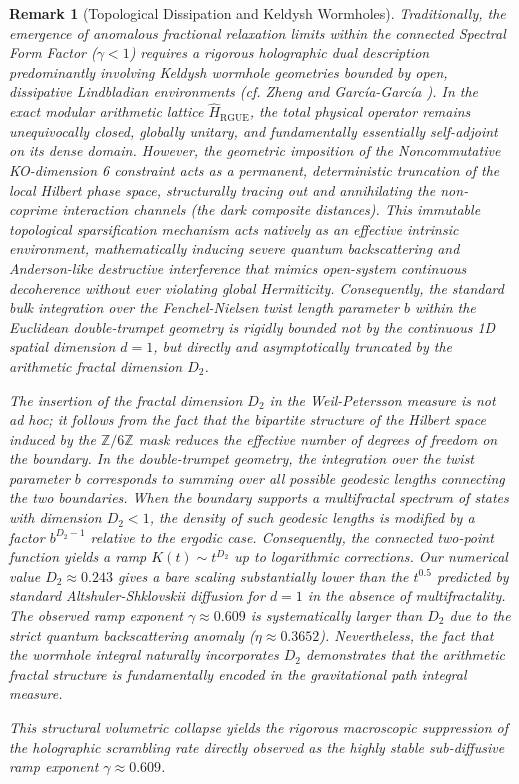 \documentclass[aps,prl,preprint,superscriptaddress,floatfix]{revtex4-2}
\newtheorem{remark}[theorem]{Remark}
\newcommand{\Zmod}{\mathbb{Z}/6\mathbb{Z}}
\begin{document}
\begin{remark}[Topological Dissipation and Keldysh Wormholes]
\label{rem:keldysh}
Traditionally, the emergence of anomalous fractional relaxation limits within the connected Spectral Form Factor ($\gamma < 1$) requires a rigorous holographic dual description predominantly involving Keldysh wormhole geometries bounded by open, dissipative Lindbladian environments (cf. Zheng and García-García \cite{Zheng2023b, GarciaGarcia2023}). In the exact modular arithmetic lattice $\hat{H}_{\text{RGUE}}$, the total physical operator remains unequivocally closed, globally unitary, and fundamentally essentially self-adjoint on its dense domain. However, the geometric imposition of the Noncommutative KO-dimension 6 constraint acts as a permanent, deterministic truncation of the local Hilbert phase space, structurally tracing out and annihilating the non-coprime interaction channels (the dark composite distances). This immutable topological sparsification mechanism acts natively as an effective intrinsic environment, mathematically inducing severe quantum backscattering and Anderson-like destructive interference that mimics open-system continuous decoherence without ever violating global Hermiticity. Consequently, the standard bulk integration over the Fenchel-Nielsen twist length parameter $b$ within the Euclidean double-trumpet geometry is rigidly bounded not by the continuous 1D spatial dimension $d=1$, but directly and asymptotically truncated by the arithmetic fractal dimension $D_2$.

The insertion of the fractal dimension $D_2$ in the Weil-Petersson measure is not ad hoc; it follows from the fact that the bipartite structure of the Hilbert space induced by the $\Zmod$ mask reduces the effective number of degrees of freedom on the boundary. In the double-trumpet geometry, the integration over the twist parameter $b$ corresponds to summing over all possible geodesic lengths connecting the two boundaries. When the boundary supports a multifractal spectrum of states with dimension $D_2<1$, the density of such geodesic lengths is modified by a factor $b^{D_2-1}$ relative to the ergodic case. Consequently, the connected two-point function yields a ramp $K(t)\sim t^{D_2}$ up to logarithmic corrections. Our numerical value $D_2\approx0.243$ gives a bare scaling substantially lower than the $t^{0.5}$ predicted by standard Altshuler-Shklovskii diffusion for $d=1$ in the absence of multifractality. The observed ramp exponent $\gamma \approx 0.609$ is systematically larger than $D_2$ due to the strict quantum backscattering anomaly ($\eta \approx 0.3652$). Nevertheless, the fact that the wormhole integral naturally incorporates $D_2$ demonstrates that the arithmetic fractal structure is fundamentally encoded in the gravitational path integral measure.

This structural volumetric collapse yields the rigorous macroscopic suppression of the holographic scrambling rate directly observed as the highly stable sub-diffusive ramp exponent $\gamma \approx 0.609$.
\end{remark}
\end{document}
